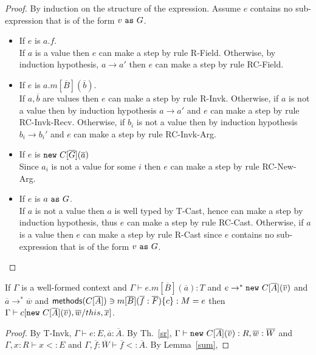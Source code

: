 \documentclass[preprint,nocopyrightspace,9pt]{sigplanconf}
\begin{document}
\begin{proof}By induction on the structure of the expression. Assume $e$ contains no sub-expression that is of the form $v~{\tt as}~G$.
\begin{itemize}
\item If $e$ is $a.f$.\\
If $a$ is a value then $e$ can make a step by rule {\sc R-Field}. Otherwise, by induction hypothesis, $a\rightarrow a'$ then $e$ can make a step by rule {\sc RC-Field}.

\item If $e$ is $a.m[\overline{B}](\overline{b})$. \\
If $a,\overline{b}$ are values then $e$ can make a step by rule {\sc R-Invk}. 
Otherwise, if $a$ is not a value then by induction hypothesis $a\rightarrow a'$ and $e$ can make a step by rule {\sc RC-Invk-Recv}. Otherwise, if $b_i$ is not a value then by induction hypothesis $b_i\rightarrow b_i'$ and $e$ can make a step by rule {\sc RC-Invk-Arg}. 

\item If $e$ is ${\tt new}~C[\overline{G}](\overline{a})$\\
Since $a_i$ is not a value for some $i$ then $e$ can make a step by rule {\sc RC-New-Arg}.

\item If $e$ is $a~{\tt as}~G$.\\
If $a$ is not a value then $a$ is well typed by {\sc T-Cast}, hence can make a step by induction hypothesis, thus $e$ can make a step by rule {\sc RC-Cast}.
Otherwise, if $a$ is a value then $e$ can make a step by rule {\sc R-Cast} since $e$ contains no sub-expression that is of the form $v~{\tt as}~G$.
\end{itemize}
\end{proof}

\begin{thm} If $\Gamma$ is a well-formed context and $\Gamma \vdash e.m[\overline{B}](\overline{a}):T$ and $e \rightarrow^*{\tt new}~C[\overline{A}](\overline{v})$ and $\overline{a} \rightarrow^* \overline{w}$ and ${\sf methods}(C[\overline{A}])\ni m[\overline{B}](\overline{f}:\overline{F})\{c\}:M=e$ then $\Gamma\vdash c[{\tt new}~C[\overline{A}](\overline{v}),\overline{w}/this,\overline{x}]$.
\end{thm}

\begin{proof}
By {\sc T-Invk}, $\Gamma\vdash e:E, \overline{a}:\overline{A}$.
By Th.~\ref{sr}, $\Gamma \vdash{\tt new}~C[\overline{A}](\overline{v}):R, \overline{w}:\overline{W}$ and 
$\Gamma, x:R\vdash x<:E$ and $\Gamma, \overline{f}:\overline{W}\vdash \overline{f}<:\overline{A}$. By Lemma~\ref{sum},
\end{proof}
\end{document}
